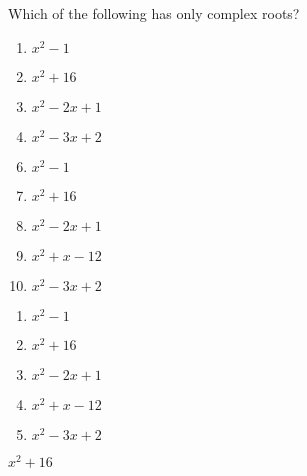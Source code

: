 


 Which of the following has only complex roots?


\ifsat
	\begin{enumerate}[label=\Alph*)]
		\item   $x^{2}-1$
		\item  $x^{2}+16$ %
		\item  $x^{2}-2x+1$
		\item   $x^{2}-3x+2$
	\end{enumerate}
\else
\fi

\ifacteven
	\begin{enumerate}[label=\textbf{\Alph*.},itemsep=\fill,align=left]
		\setcounter{enumii}{5}
		\item   $x^{2}-1$
		\item  $x^{2}+16$ %
		\item  $x^{2}-2x+1$
		\addtocounter{enumii}{1}
		\item  $x^{2}+x-12$
		\item   $x^{2}-3x+2$
	\end{enumerate}
\else
\fi

\ifactodd
	\begin{enumerate}[label=\textbf{\Alph*.},itemsep=\fill,align=left]
		\item   $x^{2}-1$
		\item  $x^{2}+16$ %
		\item  $x^{2}-2x+1$
		\item  $x^{2}+x-12$
		\item   $x^{2}-3x+2$
	\end{enumerate}
\else
\fi

\ifgridin
  $x^{2}+16$ %
		
\else
\fi

